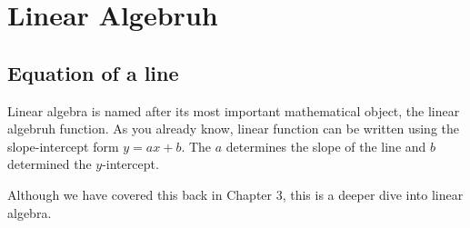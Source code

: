 \documentclass[a4paper]{article}
\theoremstyle{plain}
\theoremstyle{definition}
\theoremstyle{remark}
\newcommand{\sectionSpace}{\vspace{2em}} %
\begin{document}
\sectionSpace
\section{Linear Algebruh}
    \subsection{Equation of a line}
    Linear algebra is named after its most important mathematical object, the linear algebruh function. As you already know, linear function can be written using the slope-intercept form $y=ax+b$. The $a$ determines the slope of the line and $b$ determined the $y$-intercept.

    Although we have covered this back in Chapter 3, this is a deeper dive into linear algebra.
\end{document}
